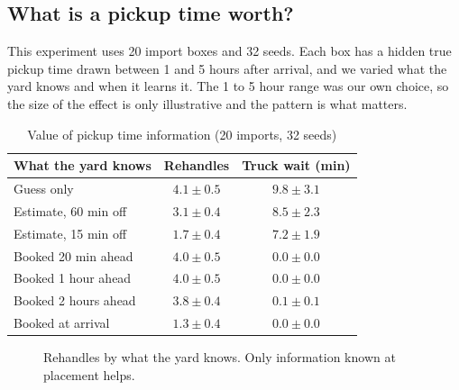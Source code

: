 \documentclass[conference]{IEEEtran}
\begin{document}
\subsection{What is a pickup time worth?}
This experiment uses 20 import boxes and 32 seeds. Each box has a hidden true pickup time drawn between 1 and 5 hours after arrival, and we varied what the yard knows and when it learns it. The 1 to 5 hour range was our own choice, so the size of the effect is only illustrative and the pattern is what matters.

\begin{table}[t]
\caption{Value of pickup time information (20 imports, 32 seeds)}
\label{tab:info}
\centering
\small
\begin{tabular}{lcc}
\toprule
What the yard knows & Rehandles & Truck wait (min) \\
\midrule
Guess only & $4.1\pm0.5$ & $9.8\pm3.1$ \\
Estimate, 60 min off & $3.1\pm0.4$ & $8.5\pm2.3$ \\
Estimate, 15 min off & $1.7\pm0.4$ & $7.2\pm1.9$ \\
Booked 20 min ahead & $4.0\pm0.5$ & $0.0\pm0.0$ \\
Booked 1 hour ahead & $4.0\pm0.5$ & $0.0\pm0.0$ \\
Booked 2 hours ahead & $3.8\pm0.4$ & $0.1\pm0.1$ \\
Booked at arrival & $1.3\pm0.4$ & $0.0\pm0.0$ \\
\bottomrule
\end{tabular}
\end{table}

\begin{figure}[t]
\centering
{}
\caption{Rehandles by what the yard knows. Only information known at placement helps.}
\label{fig:info}
\end{figure}
\end{document}
